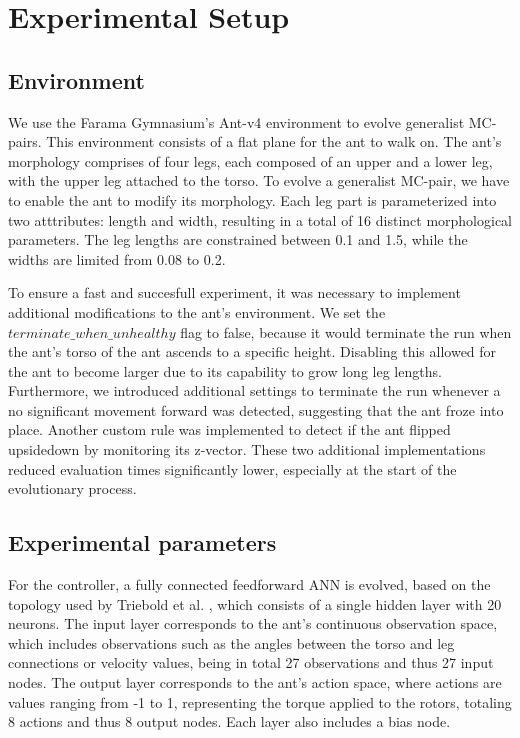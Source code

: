 \section{Experimental Setup}
    \subsection{Environment}
        We use the Farama Gymnasium's Ant-v4 environment \cite{Gymnasium2023} to evolve generalist MC-pairs. This environment consists of a flat plane for the ant to walk on. The ant's morphology comprises of four legs, each composed of an upper and a lower leg, with the upper leg attached to the torso. To evolve a generalist MC-pair, we have to enable the ant to modify its morphology. Each leg part is parameterized into two atttributes: length and width, resulting in a total of 16 distinct morphological parameters. The leg lengths are constrained between 0.1 and 1.5, while the widths are limited from 0.08 to 0.2. 

        To ensure a fast and succesfull experiment, it was necessary to implement additional modifications to the ant's environment. We set the $terminate\_when\_unhealthy$ flag to false, because it would terminate the run when the ant's torso of the ant ascends to a specific height. Disabling this allowed for the ant to become larger due to its capability to grow long leg lengths. Furthermore, we introduced additional settings to terminate the run whenever a no significant movement forward was detected, suggesting that the ant froze into place. Another custom rule was implemented to detect if the ant flipped upsidedown by monitoring its z-vector. These two additional implementations reduced evaluation times significantly lower, especially at the start of the evolutionary process. 

    \subsection{Experimental parameters}
        For the controller, a fully connected feedforward ANN is evolved, based on the topology used by Triebold et al. \cite{Corinna_Triebold}, which consists of a single hidden layer with 20 neurons. The input layer corresponds to the ant's continuous observation space, which includes observations such as the angles between the torso and leg connections or velocity values, being in total 27 observations and thus 27 input nodes. The output layer corresponds to the ant's action space, where actions are values ranging from -1 to 1, representing the torque applied to the rotors, totaling 8 actions and thus 8 output nodes. Each layer also includes a bias node.
